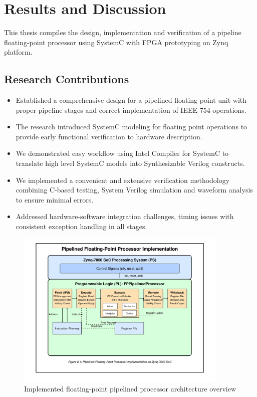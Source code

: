 
\chapter{Results and Discussion}
\label{chap:results_discussion}

This thesis compiles the design, implementation and verification of a pipeline floating-point processor using SystemC with FPGA prototyping on Zynq platform.

\section{Research Contributions}
\label{sec:research_contributions}

\begin{itemize}
    \item Established a comprehensive design for a pipelined floating-point unit with proper pipeline stages and correct implementation of IEEE 754 operations.
    
    \item The research introduced SystemC modeling for floating point operations to provide early functional verification to hardware description.
    
    \item We demonstrated easy workflow using Intel Compiler for SystemC to translate high level SystemC models into Synthesizable Verilog constructs.
    
    \item We implemented a convenient and extensive verification methodology combining C-based testing, System Verilog simulation and waveform analysis to ensure minimal errors.
    
    \item Addressed hardware-software integration challenges, timing issues with consistent exception handling in all stages.
\end{itemize}

\begin{figure}[h]
\centering
\includegraphics[width=0.9\textwidth]{figures/FP_pipelined.png}
\caption{Implemented floating-point pipelined processor architecture overview}
\label{fig:fp_pipelined}
\end{figure}

